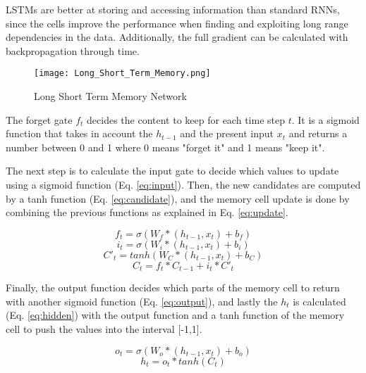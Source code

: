 LSTMs are better at storing and accessing information than standard RNNs, since the cells improve the performance when finding and exploiting long range dependencies in the data. Additionally, the full gradient can be calculated with backpropagation through time.\cite{graves2013generating}

\begin{figure}
\label{fig:lstm}
\center
\texttt{[image: Long\_Short\_Term\_Memory.png]}
\caption{Long Short Term Memory Network}
\end{figure}

The forget gate $f_t$ decides the content to keep for each time step $t$. It is a sigmoid function that takes in account the $h_{t-1}$ and the present input $x_t$ and returns a number between 0 and 1 where 0 means "forget it" and 1 means "keep it". 

The next step is to calculate the input gate to decide which values to update using a sigmoid function (Eq. \ref{eq:input}). Then, the new candidates are computed by a tanh function (Eq. \ref{eq:candidate}), and the memory cell update is done by combining the previous functions as explained in Eq. \ref{eq:update}.

\begin{equation} \label{eq:forget}
f_t=\sigma(W_f*(h_{t-1},x_t)+b_f)
\end{equation}
\begin{equation} \label{eq:input}
i_t=\sigma(W_i*(h_{t-1},x_t)+b_i)
\end{equation}
\begin{equation} \label{eq:candidate}
C'_t=tanh(W_C*(h_{t-1},x_t)+b_C)
\end{equation}
\begin{equation} \label{eq:update}
C_t=f_t*C_{t-1}+i_t*C'_t
\end{equation}

Finally, the output function decides which parts of the memory cell to return with another sigmoid function (Eq. \ref{eq:output}), and lastly the $h_t$ is calculated (Eq. \ref{eq:hidden}) with the output function and a tanh function of the memory cell to push the values into the interval [-1,1].

\begin{equation} \label{eq:output}
o_t=\sigma(W_o*(h_{t-1},x_t)+b_o)
\end{equation}
\begin{equation} \label{eq:hidden}
h_t=o_t*tanh(C_t)
\end{equation}


